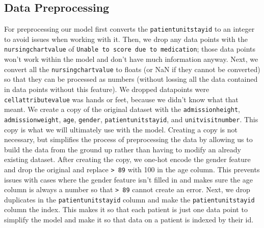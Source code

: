 \documentclass{article}
\begin{document}
\subsection{Data Preprocessing}

For preprocessing our model first converts the \texttt{patientunitstayid} to an integer to avoid issues when working with it. Then, we drop any data points with the \texttt{nursingchartvalue} of \texttt{Unable to score due to medication}; those data points won't work within the model and don't have much information anyway. Next, we convert all the \texttt{nursingchartvalue} to floats (or NaN if they cannot be converted) so that they can be processed as numbers (without lossing all the data contained in data points without this feature). We dropped datapoints were \texttt{cellattributevalue} was hands or feet, because we didn't know what that meant. We create a copy of the original dataset with the \texttt{admissionheight}, \texttt{admissionweight}, \texttt{age}, \texttt{gender}, \texttt{patientunitstayid}, and \texttt{unitvisitnumber}. This copy is what we will ultimately use with the model. Creating a copy is not necessary, but simplifies the process of preprocessing the data by allowing us to build the data from the ground up rather than having to modify an already existing dataset. After creating the copy, we one-hot encode the gender feature and drop the original and replace \texttt{> 89} with 100 in the age column. This prevents issues with cases where the gender feature isn't filled in and makes sure the age column is always a number so that \texttt{> 89} cannot create an error. Next, we drop duplicates in the \texttt{patientunitstayid} column and make the \texttt{patientunitstayid} column the index. This makes it so that each patient is just one data point to simplify the model and make it so that data on a patient is indexed by their id. 
\end{document}
